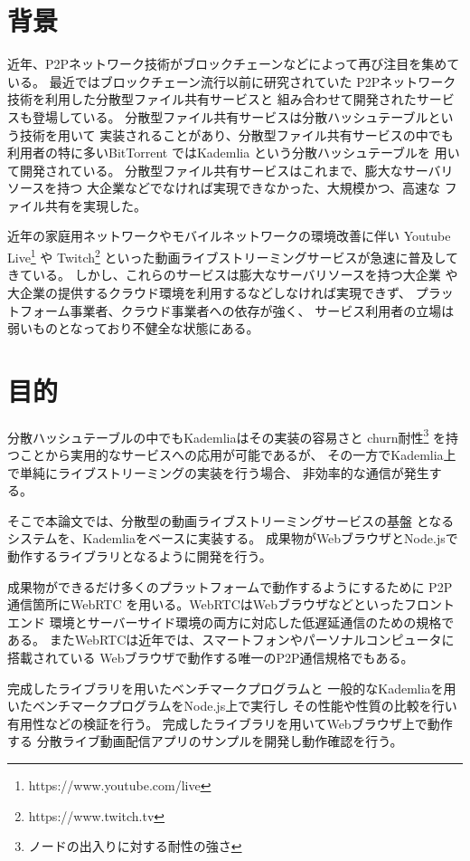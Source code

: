 \documentclass[sotsuron]{jcsie}
\begin{document}
\section{背景}
近年、P2Pネットワーク技術がブロックチェーンなどによって再び注目を集めている。
最近ではブロックチェーン流行以前に研究されていた
P2Pネットワーク技術を利用した分散型ファイル共有サービスと
組み合わせて開発されたサービスも登場している。
\cite{BitTorre1:online}
分散型ファイル共有サービスは分散ハッシュテーブルという技術を用いて
実装されることがあり、分散型ファイル共有サービスの中でも
利用者の特に多いBitTorrent\cite{BitTorre59:online}
ではKademlia\cite{maymounkov2002kademlia}\cite{高野祐輝2010nat}
という分散ハッシュテーブルを
用いて開発されている。
分散型ファイル共有サービスはこれまで、膨大なサーバリソースを持つ
大企業などでなければ実現できなかった、大規模かつ、高速な
ファイル共有を実現した。

近年の家庭用ネットワークやモバイルネットワークの環境改善に伴い
Youtube Live\footnote{https://www.youtube.com/live} や 
Twitch\footnote{https://www.twitch.tv} 
といった動画ライブストリーミングサービスが急速に普及してきている。
しかし、これらのサービスは膨大なサーバリソースを持つ大企業
や大企業の提供するクラウド環境を利用するなどしなければ実現できず、
プラットフォーム事業者、クラウド事業者への依存が強く、
サービス利用者の立場は弱いものとなっており不健全な状態にある。

\section{目的}
分散ハッシュテーブルの中でもKademliaはその実装の容易さと
churn耐性\footnote{ノードの出入りに対する耐性の強さ}
を持つことから実用的なサービスへの応用が可能であるが、
その一方でKademlia上で単純にライブストリーミングの実装を行う場合、
非効率的な通信が発生する。

そこで本論文では、分散型の動画ライブストリーミングサービスの基盤
となるシステムを、Kademliaをベースに実装する。
成果物がWebブラウザとNode.jsで動作するライブラリとなるように開発を行う。

成果物ができるだけ多くのプラットフォームで動作するようにするために
P2P通信箇所にWebRTC \cite{WebRTCHo80:online}
を用いる。WebRTCはWebブラウザなどといったフロントエンド
環境とサーバーサイド環境の両方に対応した低遅延通信のための規格である。
またWebRTCは近年では、スマートフォンやパーソナルコンピュータに搭載されている
Webブラウザで動作する唯一のP2P通信規格でもある。

完成したライブラリを用いたベンチマークプログラムと
一般的なKademliaを用いたベンチマークプログラムをNode.js上で実行し
その性能や性質の比較を行い有用性などの検証を行う。
完成したライブラリを用いてWebブラウザ上で動作する
分散ライブ動画配信アプリのサンプルを開発し動作確認を行う。
\end{document}
